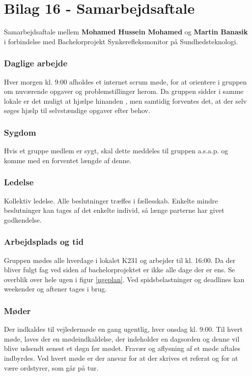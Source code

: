 

\chapter*{Bilag 16 - Samarbejdsaftale}


Samarbejdsaftale mellem \textbf{Mohamed Hussein Mohamed} og\textbf{ Martin Banasik} i forbindelse med Bachelorprojekt Synkerefleksmonitor på Sundhedsteknologi. 

\subsection*{Daglige arbejde}
Hver morgen kl. 9:00 afholdes et internet scrum møde, for at orientere i gruppen om nuværende opgaver og problemstillinger herom. 
Da gruppen sidder i samme lokale er det muligt at hjælpe hinanden , men samtidig forventes det, at der selv søges hjælp til selvstændige opgaver efter behov. 

\subsection*{Sygdom}
Hvis et gruppe medlem er sygt, skal dette meddeles til gruppen a.s.a.p. og komme med en forventet længde af denne.

\subsection*{Ledelse}
Kollektiv ledelse. 
Alle beslutninger træffes i fællesskab. 
Enkelte mindre beslutninger kan tages af det enkelte individ, så længe parterne har givet godkendelse. 

\subsection*{Arbejdsplads og tid}
Gruppen mødes alle hverdage i lokalet K231 og arbejder til kl. 16:00. Da der bliver fulgt fag ved siden af bachelorprojektet er ikke alle dage der er ens. Se overblik over hele ugen i figur \ref{ugeplan}. Ved spidsbelastninger og deadlines kan weekender og aftener tages i brug.

\subsection*{Møder}
Der indkaldes til vejledermøde en gang ugentlig, hver onsdag kl. 9:00. 
Til hvert møde, laves der en mødeindkaldelse, der indeholder en dagsorden og denne vil blive udsendt senest et døgn før mødet.
Fravær og aflysning af et møde aftales indbyrdes. 
Ved hvert møde er der ansvar for at der skrives et referat og for at være ordstyrer, som går på tur.


